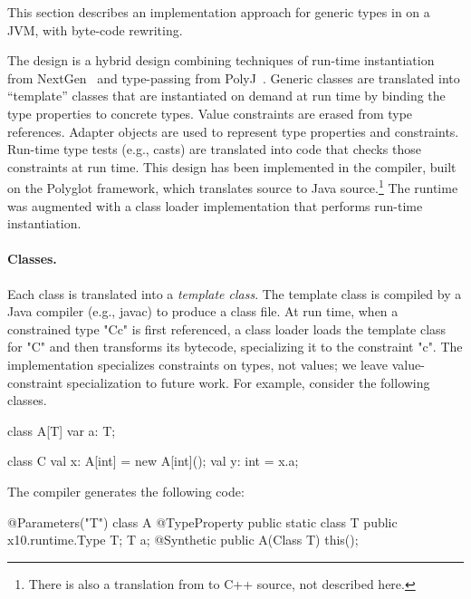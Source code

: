 This section describes an implementation approach for generic types in
\Xten{} on a JVM, with byte-code rewriting.

The design is a hybrid design combining techniques of run-time
instantiation from
NextGen~\cite{nextgen,allen03,allen04} and type-passing from
PolyJ~\cite{java-popl97}.  Generic classes are translated
into ``template'' classes that are instantiated on demand at run time by
binding the type properties to concrete types.
%
Value constraints are erased from type references.
Adapter objects are used to represent type
properties and constraints.  
Run-time type tests (e.g., casts) are translated
into code that checks those constraints at run time.
%
This design has been implemented in the \Xten{} compiler, built
on the Polyglot framework, which
translates \Xten{} source to Java source.\footnote{There is also
a translation from \Xten{} to C++ source, not described here.}
The \Xten{} runtime was augmented with a class loader
implementation that performs run-time instantiation.

\paragraph{Classes.}
Each class is translated into a \emph{template class}.
The template class is compiled by a Java compiler (e.g., javac)
to produce a class file.
At run time, when a constrained type \xcd"C{c}" is first referenced, a
class loader loads the template class for \xcd"C" and then
transforms its bytecode, specializing it to the constraint
\xcd"c".  The implementation specializes constraints on
types, not values; we leave value-constraint specialization to
future work.
%
For example, consider the following classes.
{\footnotesize
\begin{xten}
class A[T] {
    var a: T;
}
\end{xten}}
{\footnotesize
\begin{xten}
class C {
    val x: A[int] = new A[int]();
    val y: int = x.a;
}
\end{xten}}

The compiler generates the following code:
{\footnotesize
\begin{xten}
@Parameters({"T"})
class A {
    @TypeProperty public static class T { }
    public x10.runtime.Type T;
    T a;
    @Synthetic public A(Class T) { this(); }
}
\end{xten}}
{\footnotesize
{}}


